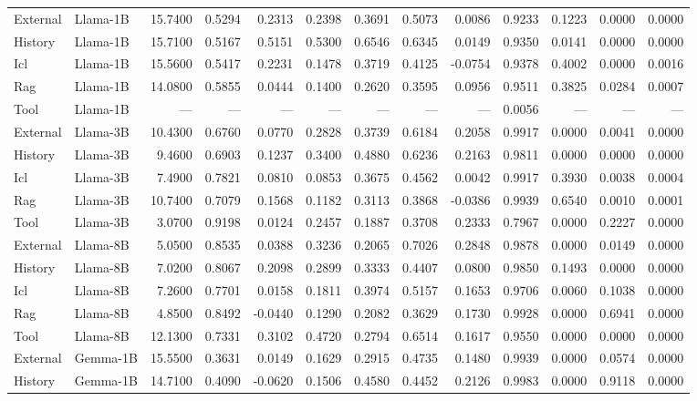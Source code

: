 \begin{tabular}{llrrrrrrrrrrr}
External & Llama-1B & 15.7400 & 0.5294 & 0.2313 & 0.2398 & 0.3691 & 0.5073 & 0.0086 & 0.9233 & 0.1223 & 0.0000 & 0.0000 \\
History & Llama-1B & 15.7100 & 0.5167 & 0.5151 & 0.5300 & 0.6546 & 0.6345 & 0.0149 & 0.9350 & 0.0141 & 0.0000 & 0.0000 \\
Icl & Llama-1B & 15.5600 & 0.5417 & 0.2231 & 0.1478 & 0.3719 & 0.4125 & -0.0754 & 0.9378 & 0.4002 & 0.0000 & 0.0016 \\
Rag & Llama-1B & 14.0800 & 0.5855 & 0.0444 & 0.1400 & 0.2620 & 0.3595 & 0.0956 & 0.9511 & 0.3825 & 0.0284 & 0.0007 \\
Tool & Llama-1B & --- & --- & --- & --- & --- & --- & --- & 0.0056 & --- & --- & --- \\
External & Llama-3B & 10.4300 & 0.6760 & 0.0770 & 0.2828 & 0.3739 & 0.6184 & 0.2058 & 0.9917 & 0.0000 & 0.0041 & 0.0000 \\
History & Llama-3B & 9.4600 & 0.6903 & 0.1237 & 0.3400 & 0.4880 & 0.6236 & 0.2163 & 0.9811 & 0.0000 & 0.0000 & 0.0000 \\
Icl & Llama-3B & 7.4900 & 0.7821 & 0.0810 & 0.0853 & 0.3675 & 0.4562 & 0.0042 & 0.9917 & 0.3930 & 0.0038 & 0.0004 \\
Rag & Llama-3B & 10.7400 & 0.7079 & 0.1568 & 0.1182 & 0.3113 & 0.3868 & -0.0386 & 0.9939 & 0.6540 & 0.0010 & 0.0001 \\
Tool & Llama-3B & 3.0700 & 0.9198 & 0.0124 & 0.2457 & 0.1887 & 0.3708 & 0.2333 & 0.7967 & 0.0000 & 0.2227 & 0.0000 \\
External & Llama-8B & 5.0500 & 0.8535 & 0.0388 & 0.3236 & 0.2065 & 0.7026 & 0.2848 & 0.9878 & 0.0000 & 0.0149 & 0.0000 \\
History & Llama-8B & 7.0200 & 0.8067 & 0.2098 & 0.2899 & 0.3333 & 0.4407 & 0.0800 & 0.9850 & 0.1493 & 0.0000 & 0.0000 \\
Icl & Llama-8B & 7.2600 & 0.7701 & 0.0158 & 0.1811 & 0.3974 & 0.5157 & 0.1653 & 0.9706 & 0.0060 & 0.1038 & 0.0000 \\
Rag & Llama-8B & 4.8500 & 0.8492 & -0.0440 & 0.1290 & 0.2082 & 0.3629 & 0.1730 & 0.9928 & 0.0000 & 0.6941 & 0.0000 \\
Tool & Llama-8B & 12.1300 & 0.7331 & 0.3102 & 0.4720 & 0.2794 & 0.6514 & 0.1617 & 0.9550 & 0.0000 & 0.0000 & 0.0000 \\
External & Gemma-1B & 15.5500 & 0.3631 & 0.0149 & 0.1629 & 0.2915 & 0.4735 & 0.1480 & 0.9939 & 0.0000 & 0.0574 & 0.0000 \\
History & Gemma-1B & 14.7100 & 0.4090 & -0.0620 & 0.1506 & 0.4580 & 0.4452 & 0.2126 & 0.9983 & 0.0000 & 0.9118 & 0.0000 \\

\end{tabular}
